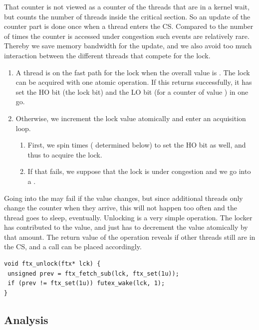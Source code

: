 That counter is not viewed as a counter of the threads that are in
a kernel wait, but counts the number of threads inside the critical
section.  So an update of the counter part is done once when a
thread enters the CS.
\iflong%
Compared to the number of times
the counter is accessed under congestion such events are relatively
rare. Thereby we save memory bandwidth for the update, and we also
avoid too much interaction between the different threads that
compete for the lock.
\fi

\itemadjust
\begin{enumerate}
\item A thread is on the fast path for the lock when the overall value
is . The lock can be acquired with one atomic operation.
\iflong%
If
this returns successfully, it has set the HO bit (the lock bit)
and the LO bit (for a counter of value ) in one go.
\fi
\itemadjust
\item Otherwise, we increment the lock value atomically and enter an
  acquisition loop.\itemadjust
\begin{enumerate}
\item First, we spin  times
\iflong%
( determined below) to set the HO
bit as well, and thus
\else%
to
\fi%
acquire the lock.
\item If that fails,
\iflong%
we suppose that the lock is under congestion and
\fi%
we go into a .
\itemadjust
\end{enumerate}
\end{enumerate}
\iflong%
Going into the  may fail if the value changes, but
since additional threads only change the counter when they arrive,
this will not happen too often and the thread goes to sleep,
eventually.
\fi%
Unlocking is a very simple operation. The locker has contributed
 to the value, and just has to decrement the value
atomically by that amount.  The return value of the operation
reveals if other threads still are in the CS, and a
 call can be placed accordingly.
\iflong%
\lstset{language=C11,label= ,caption= ,numbers=none}
\begin{lstlisting}
void ftx_unlock(ftx* lck) {
 unsigned prev = ftx_fetch_sub(lck, ftx_set(1u));
 if (prev != ftx_set(1u)) futex_wake(lck, 1);
}
\end{lstlisting}
\fi

\subsection{Analysis}
\label{sec-3-2}

